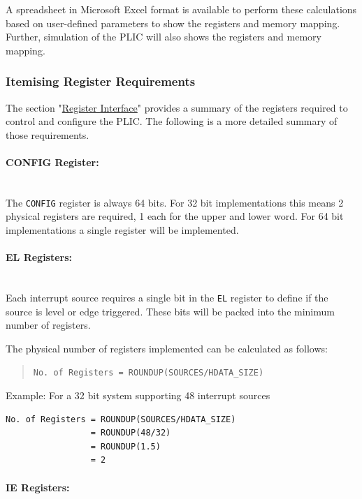 A spreadsheet in Microsoft Excel format is available to perform these calculations based on user-defined parameters to show the registers and
memory mapping.
Further, simulation of the PLIC will also shows the registers and memory mapping.

\subsubsection{Itemising Register Requirements}

The section "\protect\hyperlink{register-interface}{Register Interface}" provides a summary of the registers required to control and configure
the PLIC.
The following is a more detailed summary of those requirements.

\paragraph{CONFIG Register:} ~\\

The \texttt{CONFIG} register is always 64 bits.
For 32 bit implementations this means 2 physical registers are required, 1 each for the upper and lower word.
For 64 bit implementations a single register will be implemented.

\paragraph{EL Registers:} ~\\

Each interrupt source requires a single bit in the \texttt{EL} register to define if the source is level or edge triggered.
These bits will be packed into the minimum number of registers.

The physical number of registers implemented can be calculated as follows:

\begin{quote}
\texttt{No.\ of\ Registers\ =\ ROUNDUP(SOURCES/HDATA\_SIZE)}
\end{quote}

Example: For a 32 bit system supporting 48 interrupt sources

\begin{verbatim}
No. of Registers = ROUNDUP(SOURCES/HDATA_SIZE)   
                 = ROUNDUP(48/32)
                 = ROUNDUP(1.5)
                 = 2
\end{verbatim}

\paragraph{IE Registers:} ~\\

